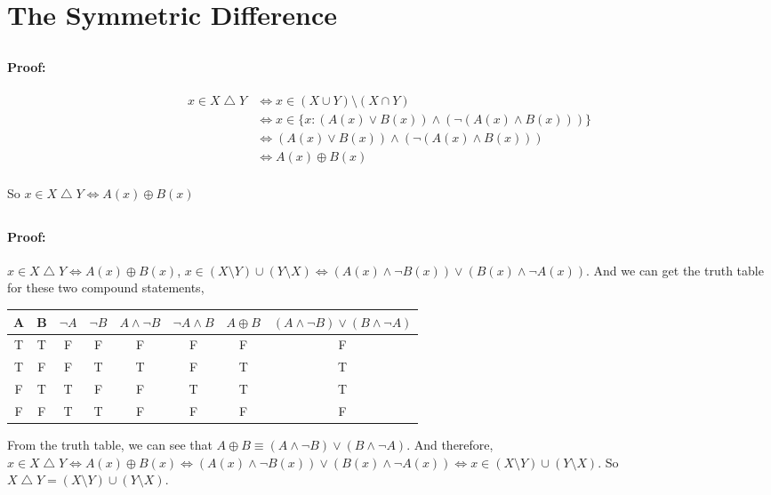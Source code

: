 \documentclass[a4paper,12pt,titlepage]{article}
\begin{document}
\section{The Symmetric Difference}
\subsection{}
\paragraph{Proof:}
\begin{align*}
x \in X\bigtriangleup Y&\Leftrightarrow x\in(X\cup Y)\setminus(X\cap Y)\\
&\Leftrightarrow x\in \lbrace x: (A(x)\vee B(x))\wedge(\neg(A(x)\wedge B(x)))\rbrace\\
&\Leftrightarrow (A(x)\vee B(x))\wedge(\neg(A(x)\wedge B(x)))\\
&\Leftrightarrow A(x)\oplus B(x)
\end{align*}

\paragraph{}So $x \in X\bigtriangleup Y\Leftrightarrow A(x)\oplus B(x)$

\subsection{}
\paragraph{Proof:} $x \in X\bigtriangleup Y\Leftrightarrow A(x)\oplus B(x)$, 
$x \in (X\setminus Y)\cup(Y\setminus X)\Leftrightarrow (A(x)\wedge \neg B(x))\vee(B(x)\wedge \neg A(x))$. And we can get the truth table for these two compound statements,

\begin{table}[ht]
\newcommand{\tabincell}[2]{\begin{tabular}{@{}#1@{}}#2\end{tabular}}
  \centering
\begin{tabular}{|c|c|c|c|c|c|c|c|}
\hline
\hline
A & B & $\neg A$ & $\neg B$ & $A \wedge \neg B$ & $\neg A \wedge B$ & $A\oplus B$ &  $(A\wedge \neg B)\vee (B\wedge \neg A)$ \\
\hline
T & T & F & F & F & F & F & F \\
\hline
T & F & F & T & T & F & T & T \\
\hline
F & T & T & F & F & T & T & T \\
\hline
F & F & T & T & F & F & F & F \\
\hline
\hline
\end{tabular}
\end{table}
From the truth table, we can see that $A\oplus B\equiv(A\wedge \neg B)\vee (B\wedge \neg A)$.    And therefore, $x \in X\bigtriangleup Y\Leftrightarrow A(x)\oplus B(x)\Leftrightarrow (A(x)\wedge \neg B(x))\vee(B(x)\wedge \neg A(x))\Leftrightarrow x \in (X\setminus Y)\cup(Y\setminus X)$. So $X\bigtriangleup Y=(X\setminus Y)\cup(Y\setminus X)$.
\end{document}
